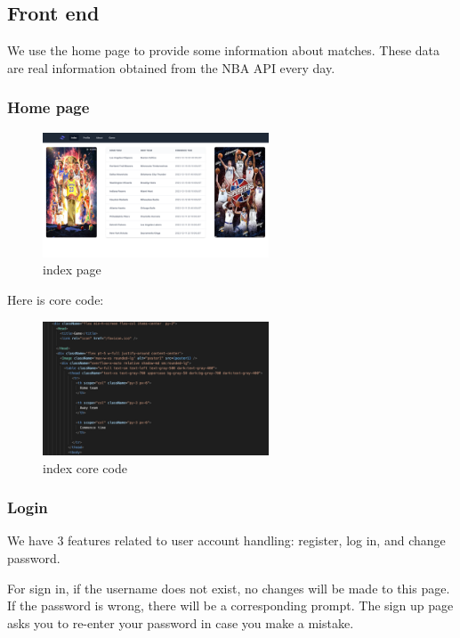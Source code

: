 \documentclass[singlecolumn]{article}
\begin{document}
\subsection{Front end}

We use the home page to provide some information about matches. These data are real information obtained from the NBA API every day.

\subsubsection{Home page}

\begin{figure}[H]
    \centering
    \includegraphics[width=0.6\textwidth]{index.png}
    \caption{index page}
    \label{fig:index}
\end{figure}

Here is core code:

\begin{figure}[H]
    \centering
    \includegraphics[width=0.6\textwidth]{index_code.png}
    \caption{index core code}
    \label{fig:index_code}
\end{figure}

\subsubsection{Login}
We have 3 features related to user account handling: register, log in, and change password. 

For sign in, if the username does not exist, no changes will be made to this page. If the password is wrong, there will be a corresponding prompt. The sign up page asks you to re-enter your password in case you make a mistake. 
\end{document}
